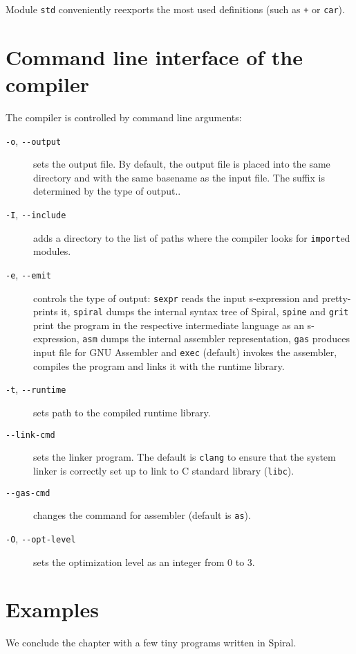 Module \texttt{std} conveniently reexports the most used definitions (such as
\texttt{+} or \texttt{car}).

\section{Command line interface of the compiler}

The compiler is controlled by command line arguments:

\begin{description}
  \item[\texttt{-o}, \texttt{-{}-output}] sets the output file. By default, the
    output file is placed into the same directory and with the same basename as
    the input file. The suffix is determined by the type of output..
  \item[\texttt{-I}, \texttt{-{}-include}] adds a directory to the list of paths
    where the compiler looks for \texttt{import}ed modules.
  \item[\texttt{-e}, \texttt{-{}-emit}] controls the type of output:
    \texttt{sexpr} reads the input s-expression and pretty-prints it,
    \texttt{spiral} dumps the internal syntax tree of Spiral, \texttt{spine} and
    \texttt{grit} print the program in the respective intermediate language as
    an s-expression, \texttt{asm} dumps the internal assembler representation,
    \texttt{gas} produces input file for GNU Assembler and \texttt{exec}
    (default) invokes the assembler, compiles the program and links it with the
    runtime library.
  \item[\texttt{-t}, \texttt{-{}-runtime}] sets path to the compiled runtime
    library.
  \item[\texttt{-{}-link-cmd}] sets the linker program. The default is
    \texttt{clang} to ensure that the system linker is correctly set up to link
    to C standard library (\texttt{libc}).
  \item[\texttt{-{}-gas-cmd}] changes the command for assembler (default is
    \texttt{as}).
  \item[\texttt{-O}, \texttt{-{}-opt-level}] sets the optimization level as
    an integer from 0 to 3.
\end{description}

\section{Examples}

We conclude the chapter with a few tiny programs written in Spiral.

